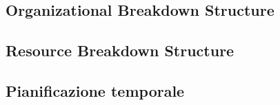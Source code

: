 \subsection{Organizational Breakdown Structure}


\subsection{Resource Breakdown Structure}


\subsection{Pianificazione temporale}
